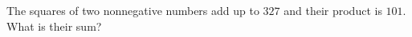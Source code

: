 The squares of two nonnegative numbers add up to $327$ and their product is $101$. What is their sum?
